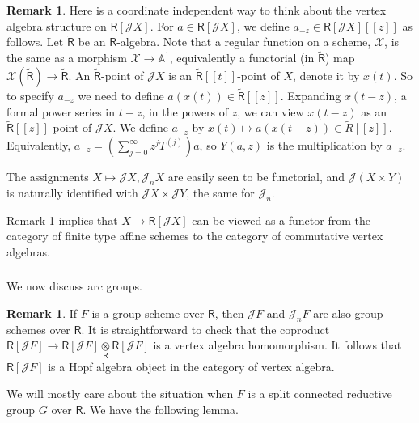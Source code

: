 \documentclass{amsart}
\theoremstyle{definition}
\newtheorem{Rem}[Thm]{Remark}
\newcommand{\sss}{\subsubsection{}}
\newcommand{\Ring}{\mathsf{R}}
\newcommand{\Jet}{\mathscr{J}}
\numberwithin{equation}{section}
\begin{document}
\begin{Rem}\label{Rem:jet_vertex_coordinate_free}
Here is a coordinate independent way to think about 
the vertex algebra structure on $\Ring[\Jet X]$. 
For $a\in \Ring[\Jet X]$, we define $a_{-z}\in \Ring[\Jet X][[z]]$ as follows. Let $\tilde{\Ring}$
be an $\Ring$-algebra. Note that a regular function on a scheme, $\mathscr{X}$, is the same as a morphism $\mathscr{X}\rightarrow \mathbb{A}^1$, equivalently a functorial (in $\tilde{\Ring}$) map $\mathscr{X}(\tilde{\Ring})\rightarrow \tilde{\Ring}$. An $\tilde{\Ring}$-point of $\Jet X$ is an $\tilde{\Ring}[[t]]$-point of $X$, denote it by $x(t)$. So to specify $a_{-z}$ we need to define $a(x(t))\in \tilde{\Ring}[[z]]$. Expanding $x(t-z)$, a formal power series in $t-z$, in the powers of $z$, we can view $x(t-z)$ as an $\tilde{\Ring}[[z]]$-point of $\Jet X$. 
We define $a_{-z}$ by $x(t)\mapsto a(x(t-z))\in \tilde{R}[[z]]$. Equivalently, $a_{-z}=(\sum_{j=0}^\infty z^j T^{(j)})a$, so $Y(a,z)$ is the multiplication by $a_{-z}$.
\end{Rem}
The assignments $X\mapsto \Jet X,\Jet_nX$ are easily seen to be functorial, and $\Jet(X\times Y)$ is naturally identified with $\Jet X\times \Jet Y$, the same for $\Jet_n$. 

 Remark \ref{Rem:jet_vertex_coordinate_free} implies that $X\rightarrow \Ring[\Jet X]$ can be viewed as a functor from the category of finite type affine schemes to the category of commutative vertex algebras. 

\sss We now discuss arc groups.
\begin{Rem}\label{Rem:arc_group_vertex}
If $F$ is a group scheme over $\Ring$, then 
$\Jet F$ and $\Jet_nF$ are also group schemes over $\Ring$. It is straightforward to check that the coproduct 
$\Ring[\Jet F]\rightarrow \Ring[\Jet F]\underset{\Ring}\otimes\Ring[\Jet F]$ is a vertex algebra homomorphism. It follows that $\Ring[\Jet F]$ is a Hopf algebra object in the category of vertex algebra. 
\end{Rem}

We will mostly care about the situation when $F$ is a split connected reductive group $G$ over $\Ring$.  We have the following lemma. 
\end{document}
